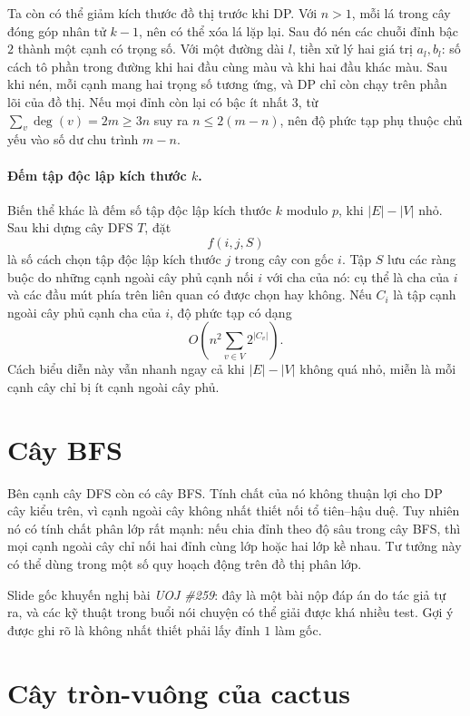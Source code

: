 \documentclass[11pt]{article}
\begin{document}
Ta còn có thể giảm kích thước đồ thị trước khi DP. Với \(n>1\), mỗi lá trong
cây đóng góp nhân tử \(k-1\), nên có thể xóa lá lặp lại. Sau đó nén các chuỗi
đỉnh bậc \(2\) thành một cạnh có trọng số. Với một đường dài \(l\), tiền xử lý
hai giá trị \(a_l,b_l\): số cách tô phần trong đường khi hai đầu cùng màu và
khi hai đầu khác màu. Sau khi nén, mỗi cạnh mang hai trọng số tương ứng, và
DP chỉ còn chạy trên phần lõi của đồ thị. Nếu mọi đỉnh còn lại có bậc ít nhất
\(3\), từ \(\sum_v \deg(v)=2m\ge 3n\) suy ra \(n\le 2(m-n)\), nên độ phức tạp
phụ thuộc chủ yếu vào số dư chu trình \(m-n\).

\paragraph{Đếm tập độc lập kích thước \(k\).}
Biến thể khác là đếm số tập độc lập kích thước \(k\) modulo \(p\), khi
\(|E|-|V|\) nhỏ. Sau khi dựng cây DFS \(T\), đặt
\[
  f(i,j,S)
\]
là số cách chọn tập độc lập kích thước \(j\) trong cây con gốc \(i\). Tập
\(S\) lưu các ràng buộc do những cạnh ngoài cây phủ cạnh nối \(i\) với cha
của nó: cụ thể là cha của \(i\) và các đầu mút phía trên liên quan có được
chọn hay không. Nếu \(C_i\) là tập cạnh ngoài cây phủ cạnh cha của \(i\), độ
phức tạp có dạng
\[
  O\!\left(n^2\sum_{v\in V}2^{|C_v|}\right).
\]
Cách biểu diễn này vẫn nhanh ngay cả khi \(|E|-|V|\) không quá nhỏ, miễn là
mỗi cạnh cây chỉ bị ít cạnh ngoài cây phủ.

\section{Cây BFS}

Bên cạnh cây DFS còn có cây BFS. Tính chất của nó không thuận lợi cho DP cây
kiểu trên, vì cạnh ngoài cây không nhất thiết nối tổ tiên--hậu duệ. Tuy nhiên
nó có tính chất phân lớp rất mạnh: nếu chia đỉnh theo độ sâu trong cây BFS,
thì mọi cạnh ngoài cây chỉ nối hai đỉnh cùng lớp hoặc hai lớp kề nhau. Tư
tưởng này có thể dùng trong một số quy hoạch động trên đồ thị phân lớp.

Slide gốc khuyến nghị bài \emph{UOJ \#259}: đây là một bài nộp đáp án do tác
giả tự ra, và các kỹ thuật trong buổi nói chuyện có thể giải được khá nhiều
test. Gợi ý được ghi rõ là không nhất thiết phải lấy đỉnh \(1\) làm gốc.

\section{Cây tròn-vuông của cactus}
\end{document}
